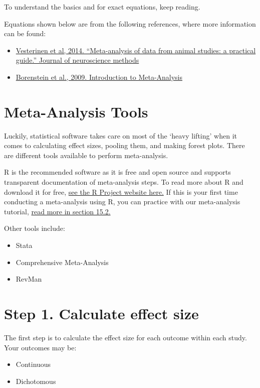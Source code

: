 \documentclass[
]{book}
\providecommand{\tightlist}{%
  \setlength{\itemsep}{0pt}\setlength{\parskip}{0pt}}
\begin{document}
To understand the basics and for exact equations, keep reading.

Equations shown below are from the following references, where more information can be found:

\begin{itemize}
\tightlist
\item
  \href{https://doi.org/10.1016/j.jneumeth.2013.09.010}{Vesterinen et al, 2014. ``Meta-analysis of data from animal studies: a practical guide.'' Journal of neuroscience methods}
\item
  \href{https://doi.org/10.1002/9780470743386}{Borenstein et al., 2009. Introduction to Meta-Analysis}
\end{itemize}

\section{Meta-Analysis Tools}\label{meta-analysis-tools}

Luckily, statistical software takes care on most of the `heavy lifting' when it comes to calculating effect sizes, pooling them, and making forest plots.
There are different tools available to perform meta-analysis.

R is the recommended software as it is free and open source and supports transparent documentation of meta-analysis steps. To read more about R and download it for free, \href{https://www.r-project.org/}{see the R Project website here.}
If this is your first time conducting a meta-analysis using R, you can practice with our meta-analysis tutorial, \hyperref[meta-analysis-tutorial]{read more in section 15.2.}

Other tools include:

\begin{itemize}
\tightlist
\item
  Stata
\item
  Comprehensive Meta-Analysis
\item
  RevMan
\end{itemize}

\section{Step 1. Calculate effect size}\label{step-1.-calculate-effect-size}

The first step is to calculate the effect size for each outcome within each study. Your outcomes may be:

\begin{itemize}
\tightlist
\item
  Continuous
\item
  Dichotomous
\end{itemize}
\end{document}
